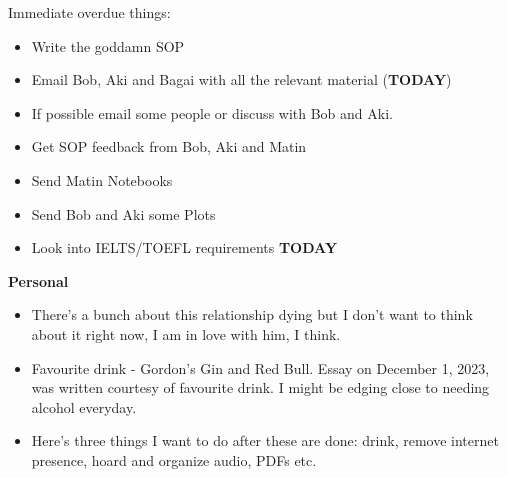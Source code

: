\noindent {}

Immediate overdue things:
\begin{itemize}
    \item Write the goddamn SOP
    \item Email Bob, Aki and Bagai with all the relevant material (\textbf{TODAY})
    \item If possible email some people or discuss with Bob and Aki. 
    \item Get SOP feedback from Bob, Aki and Matin
    \item Send Matin Notebooks
    \item Send Bob and Aki some Plots
    \item Look into IELTS/TOEFL requirements \textbf{TODAY}
\end{itemize}

\noindent \textbf{Personal}\\
\begin{itemize}
    \item There's a bunch about this relationship dying but I don't want to think about it right now, I am in love with him, I think.
    \item Favourite drink - Gordon's Gin and Red Bull. Essay on December 1, 2023, was written courtesy of favourite drink. I might be edging close to needing alcohol everyday.
    \item  Here's three things I want to do after these are done: drink, remove internet presence, hoard and organize audio, PDFs etc.
\end{itemize}